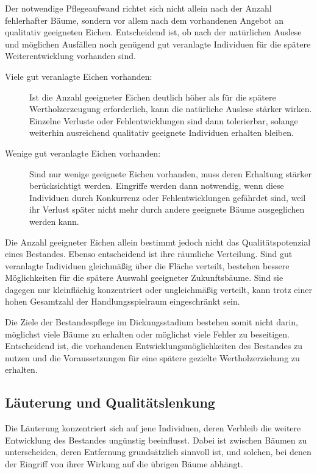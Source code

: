 \documentclass[twocolumn, bibliography=totoc, abstract=true]{scrartcl}
\begin{document}
Der notwendige Pflegeaufwand richtet sich nicht allein nach der Anzahl fehlerhafter Bäume, sondern vor allem nach dem vorhandenen Angebot an qualitativ geeigneten Eichen. Entscheidend ist, ob nach der natürlichen Auslese und möglichen Ausfällen noch genügend gut veranlagte Individuen für die spätere Weiterentwicklung vorhanden sind.

\begin{description}
\item[Viele gut veranlagte Eichen vorhanden:] Ist die Anzahl geeigneter Eichen deutlich höher als für die spätere Wertholzerzeugung erforderlich, kann die natürliche Auslese stärker wirken. Einzelne Verluste oder Fehlentwicklungen sind dann tolerierbar, solange weiterhin ausreichend qualitativ geeignete Individuen erhalten bleiben.
\item[Wenige gut veranlagte Eichen vorhanden:] Sind nur wenige geeignete Eichen vorhanden, muss deren Erhaltung stärker berücksichtigt werden. Eingriffe werden dann notwendig, wenn diese Individuen durch Konkurrenz oder Fehlentwicklungen gefährdet sind, weil ihr Verlust später nicht mehr durch andere geeignete Bäume ausgeglichen werden kann.
\end{description}

Die Anzahl geeigneter Eichen allein bestimmt jedoch nicht das Qualitätspotenzial eines Bestandes. Ebenso entscheidend ist ihre räumliche Verteilung. Sind gut veranlagte Individuen gleichmäßig über die Fläche verteilt, bestehen bessere Möglichkeiten für die spätere Auswahl geeigneter Zukunftsbäume. Sind sie dagegen nur kleinflächig konzentriert oder ungleichmäßig verteilt, kann trotz einer hohen Gesamtzahl der Handlungsspielraum eingeschränkt sein.

Die Ziele der Bestandespflege im Dickungsstadium bestehen somit nicht darin, möglichst viele Bäume zu erhalten oder möglichst viele Fehler zu beseitigen. Entscheidend ist, die vorhandenen Entwicklungsmöglichkeiten des Bestandes zu nutzen und die Voraussetzungen für eine spätere gezielte Wertholzerziehung zu erhalten.

\subsection{Läuterung und Qualitätslenkung}

Die Läuterung konzentriert sich auf jene Individuen, deren Verbleib die weitere Entwicklung des Bestandes ungünstig beeinflusst. Dabei ist zwischen Bäumen zu unterscheiden, deren Entfernung grundsätzlich sinnvoll ist, und solchen, bei denen der Eingriff von ihrer Wirkung auf die übrigen Bäume abhängt.
\end{document}
